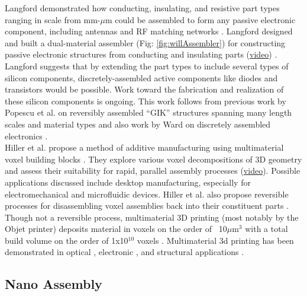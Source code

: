 {%

Langford demonstrated how conducting, insulating, and resistive part types ranging in scale from mm-$\mu$m could be assembled to form any passive electronic component, including antennas and RF matching networks \cite{Langford2014}.  Langford designed and built a dual-material assembler (Fig: \ref{fig:willAssembler}) for constructing passive electronic structures from conducting and insulating parts (\href{http://dma.cba.mit.edu/stapler/video/dualstapler_full_1.mp4}{video}) \cite{LangfordWillGhassaeiAmandaGershenfeld2016}.  Langford suggests that by extending the part types to include several types of silicon components, discretely-assembled active components like diodes and transistors would be possible.  Work toward the fabrication and realization of these silicon components is ongoing.  This work follows from previous work by Popescu et al. on reversibly assembled ``GIK'' structures spanning many length scales and material types \cite{Popescu} and also work by Ward on discretely assembled electronics \cite{Ward2010}.
\\

Hiller et al. propose a method of additive manufacturing using multimaterial voxel building blocks \cite{Hiller2009a}.  They explore various voxel decompositions of 3D geometry and assess their suitability for rapid, parallel assembly processes (\href{https://www.youtube.com/watch?v=-szjlhVMGh4}{video}).  Possible applications discussed include desktop manufacturing, especially for electromechanical and microfluidic devices.  Hiller et al. also propose reversible processes for disassembling voxel assemblies back into their constituent parts \cite{Hiller2005}.
\\

Though not a reversible process, multimaterial 3D printing (most notably by the Objet printer) deposits material in voxels on the order of ~10$\mu$m$^{3}$ with a total build volume on the order of 1x10$^{10}$ voxels \cite{Objet1000}.  Multimaterial 3d printing has been demonstrated in optical \cite{Willis2012}, electronic \cite{Ahn2009}, and structural applications \cite{Skouras2013} \cite{Schumacher} \cite{Bacher2014}.

\subsection{Nano Assembly}

}
